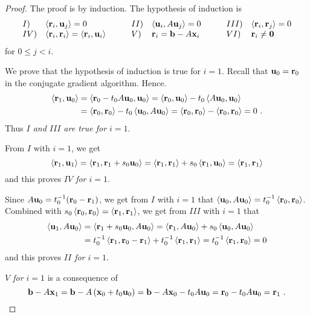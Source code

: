 \begin{proof}
The proof is by induction.  The hypothesis of induction is
\[
\begin{array}{ll@{\hspace{3em}}ll@{\hspace{3em}}ll}
I) & \ps{\VEC{r}_i}{\VEC{u}_j} = 0 &
II) & \ps{\VEC{u}_i}{A\VEC{u}_j} = 0 &
III) & \ps{\VEC{r}_i}{\VEC{r}_j} = 0 \\
IV) & \ps{\VEC{r}_i}{\VEC{r}_i} = \ps{\VEC{r}_i}{\VEC{u}_i} &
V) & \VEC{r}_i = \VEC{b}-A\VEC{x}_i &
VI) & \VEC{r}_i \neq \VEC{0}
\end{array}
\]
for $0 \leq j < i$.


We prove that the hypothesis of induction is true for $i=1$.
Recall that $\mathbf{u}_0 = \mathbf{r}_0$ in the conjugate gradient
algorithm.  Hence.
\begin{align*}
\left\langle{\mathbf{r}_1} , {\mathbf{u}_0}\right\rangle &= \left\langle{\mathbf{r}_0 - t_0 A \mathbf{u}_0} , {\mathbf{u}_0}\right\rangle
= \left\langle{\mathbf{r}_0} , {\mathbf{u}_0}\right\rangle - t_0 \left\langle{A\mathbf{u}_0} , {\mathbf{u}_0}\right\rangle \\
&= \left\langle{\mathbf{r}_0} , {\mathbf{r}_0}\right\rangle - t_0 \left\langle{\mathbf{u}_0} , {A\mathbf{u}_0}\right\rangle
= \left\langle{\mathbf{r}_0} , {\mathbf{r}_0}\right\rangle - \left\langle{\mathbf{r}_0} , {\mathbf{r}_0}\right\rangle = 0 \ .
\end{align*}
Thus {\em $I$ and $III$ are true for $i=1$}.

From $I$ with $i=1$, we get
\[
\left\langle{\mathbf{r}_1} , {\mathbf{u}_1}\right\rangle = \left\langle{\mathbf{r}_1} , {\mathbf{r}_1 + s_0\mathbf{u}_0}\right\rangle
= \left\langle{\mathbf{r}_1} , {\mathbf{r}_1}\right\rangle + s_0 \left\langle{\mathbf{r}_1} , {\mathbf{u}_0}\right\rangle
= \left\langle{\mathbf{r}_1} , {\mathbf{r}_1}\right\rangle
\]
and this proves {\em $IV$ for $i=1$}.

Since $A\mathbf{u}_0 = t_0^{-1}(\mathbf{r}_0 - \mathbf{r}_1)$, we get from $I$
with $i=1$ that
$\left\langle{\mathbf{u}_0} , {A\mathbf{u}_0}\right\rangle = t^{-1}_0 \left\langle{\mathbf{r}_0} , {\mathbf{r}_0}\right\rangle$.
Combined with $s_0 \left\langle{\mathbf{r}_0} , {\mathbf{r}_0}\right\rangle = \left\langle{\mathbf{r}_1} , {\mathbf{r}_1}\right\rangle$, we
get from $III$ with $i=1$ that
\begin{align*}
\left\langle{\mathbf{u}_1} , {A\mathbf{u}_0}\right\rangle &= \left\langle{\mathbf{r}_1 + s_0\mathbf{u}_0} , {A\mathbf{u}_0}\right\rangle
= \left\langle{\mathbf{r}_1} , {A\mathbf{u}_0}\right\rangle + s_0 \left\langle{\mathbf{u}_0} , {A\mathbf{u}_0}\right\rangle \\
&= t_0^{-1}\left\langle{\mathbf{r}_1} , {\mathbf{r}_0 - \mathbf{r}_1}\right\rangle +
t_0^{-1} \left\langle{\mathbf{r}_1} , {\mathbf{r}_1}\right\rangle
= t_0^{-1}\left\langle{\mathbf{r}_1} , {\mathbf{r}_0}\right\rangle = 0
\end{align*}
and this proves {\em $II$ for $i=1$}.

{\em $V$ for $i=1$} is a consequence of
\[
\mathbf{b}-A\mathbf{x}_1 = \mathbf{b}-A\left(\mathbf{x}_0+t_0\mathbf{u}_0\right)
= \mathbf{b}- A\mathbf{x}_0 - t_0 A\mathbf{u}_0
= \mathbf{r}_0 - t_0 A\mathbf{u}_0 = \mathbf{r}_1 \ .
\]


\end{proof}
